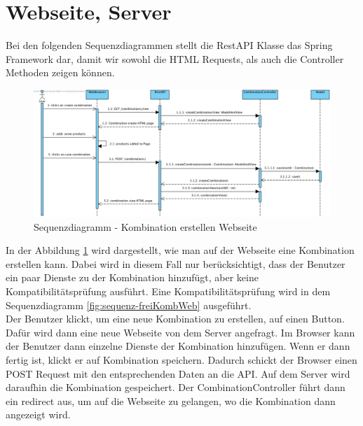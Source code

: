 \section{Webseite, Server}

Bei den folgenden Sequenzdiagrammen stellt die RestAPI Klasse das Spring Framework dar, damit wir sowohl die HTML Requests, als auch die Controller Methoden zeigen können.

\begin{figure}[h]
	\centering
	\includegraphics[width=\textwidth]{sequenzdiagramm/Kombination_erstellen}
	\caption{Sequenzdiagramm - Kombination erstellen Webseite}
	\label{fig:sequenz-erstellKombWeb}
\end{figure}
\FloatBarrier
In der Abbildung \ref{fig:sequenz-erstellKombWeb} wird dargestellt, wie man auf der Webseite eine Kombination erstellen kann.
Dabei wird in diesem Fall nur berücksichtigt, dass der Benutzer ein paar Dienste zu der Kombination hinzufügt, aber keine Kompatibilitätsprüfung ausführt.
Eine Kompatibilitätsprüfung wird in dem Sequenzdiagramm \ref{fig:sequenz-freiKombWeb} ausgeführt.\\
Der Benutzer klickt, um eine neue Kombination zu erstellen, auf einen Button.
Dafür wird dann eine neue Webseite von dem Server angefragt.
Im Browser kann der Benutzer dann einzelne Dienste der Kombination hinzufügen.
Wenn er dann fertig ist, klickt er auf Kombination speichern.
Dadurch schickt der Browser einen POST Request mit den entsprechenden Daten an die API.
Auf dem Server wird daraufhin die Kombination gespeichert.
Der CombinationController führt dann ein redirect aus, um auf die Webseite zu gelangen, wo die Kombination dann angezeigt wird.



